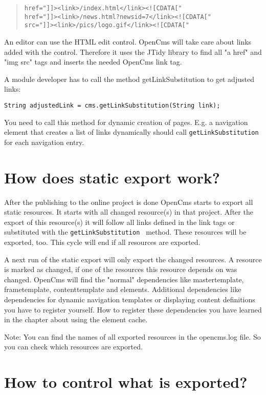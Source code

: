 \begin{quote}
\begin{verbatim}
href="]]><link>/index.html</link><![CDATA["
href="]]><link>/news.html?newsid=7</link><![CDATA["
src="]]><link>/pics/logo.gif</link><![CDATA["
\end{verbatim}
\end{quote}

An editor can use the HTML edit control. OpenCms will take care about links added with the control. Therefore it uses the JTidy library to find all "a href" and "img src" tags and inserts the needed OpenCms link tag.

A module developer has to call the method getLinkSubstitution to get adjusted links:

\texttt{String adjustedLink = cms.getLinkSubstitution(String link);}

You need to call this method for dynamic creation of pages. E.g. a navigation element that creates a list of links dynamically should call \texttt{getLinkSubstitution} for each navigation entry.

\section{How does static export work?}

After the publishing to the online project is done OpenCms starts to export all static resources. It starts with all changed resource(s) in that project. After the export of this resource(s) it will follow all links defined in the link tags or substituted with the \texttt{getLinkSubstitution } method. These resources will be exported, too. This cycle will end if all resources are exported.

A next run of the static export will only export the changed resources. A resource is marked as changed, if one of the resources this resource depends on was changed. OpenCms will find the "normal" dependencies like mastertemplate, frametemplate, contenttemplate and elements. Additional dependencies like dependencies for dynamic navigation templates or displaying content definitions you have to register yourself. How to register these dependencies you have learned in the chapter about using the element cache.

Note: You can find the names of all exported resources in the opencms.log file. So you can check which resources are exported.

\section{How to control what is exported?}

